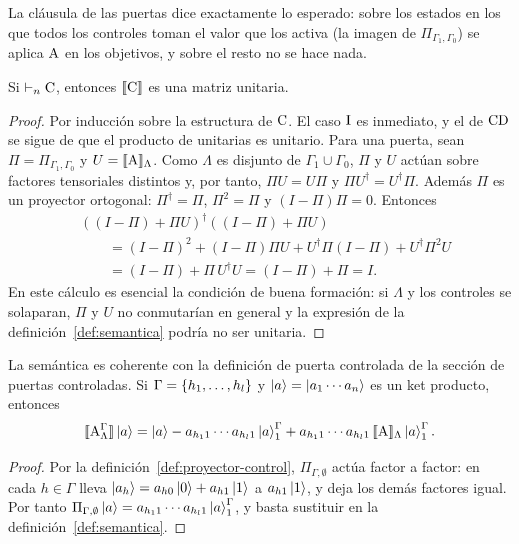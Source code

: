 La cláusula de las puertas dice exactamente lo esperado: sobre los estados en los que todos los controles toman el valor que los activa (la imagen de $\Pi_{\Gamma_1,\Gamma_0}$) se aplica $\text{A}$ en los objetivos, y sobre el resto no se hace nada.

\begin{proposition}
  \label{prop:sem-unitaria}
  Si $\vdash_n\text{C}$, entonces $\llbracket \text{C}\rrbracket$ es una matriz unitaria.
\end{proposition}
\begin{proof}
  Por inducción sobre la estructura de $\text{C}$. El caso $\text{I}$ es inmediato, y el de $\text{C}\text{D}$ se sigue de que el producto de unitarias es unitario. Para una puerta, sean $\Pi=\Pi_{\Gamma_1,\Gamma_0}$ y $U=\llbracket \text{A}\rrbracket_\Lambda$. Como $\Lambda$ es disjunto de $\Gamma_1\cup\Gamma_0$, $\Pi$ y $U$ actúan sobre factores tensoriales distintos y, por tanto, $\Pi U=U\Pi$ y $\Pi U^\dagger=U^\dagger\Pi$. Además $\Pi$ es un proyector ortogonal: $\Pi^\dagger=\Pi$, $\Pi^2=\Pi$ y $(I-\Pi)\Pi=0$. Entonces
  \begin{align*}
     & \left((I-\Pi)+\Pi U\right)^\dagger\left((I-\Pi)+\Pi U\right)                    \\
     & \qquad = (I-\Pi)^2 + (I-\Pi)\Pi U + U^\dagger\Pi(I-\Pi) + U^\dagger\Pi^2 U \\
     & \qquad = (I-\Pi) + \Pi\, U^\dagger U = (I-\Pi)+\Pi = I.
  \end{align*}
  En este cálculo es esencial la condición de buena formación: si $\Lambda$ y los controles se solaparan, $\Pi$ y $U$ no conmutarían en general y la expresión de la definición~\ref{def:semantica} podría no ser unitaria.
\end{proof}

\begin{proposition}
  \label{prop:sem-coherente}
  La semántica es coherente con la definición de puerta controlada de la sección de puertas controladas. Si $\Gamma=\{h_1,\dots,h_l\}$ y $\ket{a}=\ket{a_1\cdots a_n}$ es un ket producto, entonces
  \[
    \llbracket \text{A}^{\Gamma}_{\Lambda}\rrbracket\ket{a}
    = \ket{a}-a_{h_{1}1}\cdots a_{h_{l}1}\ket{a}^{\Gamma}_{1}+a_{h_{1}1}\cdots a_{h_{l}1}\,\llbracket \text{A}\rrbracket_\Lambda\ket{a}^{\Gamma}_{1}.
  \]
\end{proposition}
\begin{proof}
  Por la definición~\ref{def:proyector-control}, $\Pi_{\Gamma,\emptyset}$ actúa factor a factor: en cada $h\in\Gamma$ lleva $\ket{a_h}=a_{h0}\ket{0}+a_{h1}\ket{1}$ a $a_{h1}\ket{1}$, y deja los demás factores igual. Por tanto $\Pi_{\Gamma,\emptyset}\ket{a}=a_{h_{1}1}\cdots a_{h_{l}1}\ket{a}^{\Gamma}_{1}$, y basta sustituir en la definición~\ref{def:semantica}.
\end{proof}

